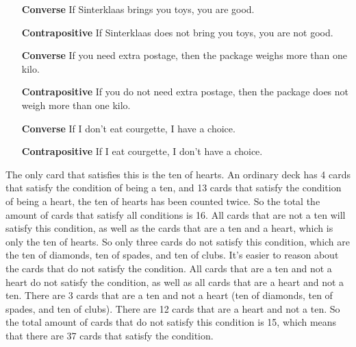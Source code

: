 \begin{solutions}
\setcounter{solutioncounter}{6}
\solution
\spart
\begin{enumerate}
	\item[\textbf{Converse}] If Sinterklaas brings you toys, you are good.
	\item[\textbf{Contrapositive}] If Sinterklaas does not bring you toys, you are not good.
\end{enumerate}
\spart
\begin{enumerate}
	\item[\textbf{Converse}] If you need extra postage, then the package weighs more than one kilo.
	\item[\textbf{Contrapositive}] If you do not need extra postage, then the package does not weigh more than one kilo.
\end{enumerate}
\spart
\begin{enumerate}
	\item[\textbf{Converse}] If I don't eat courgette, I have a choice.
	\item[\textbf{Contrapositive}] If I eat courgette, I don't have a choice.
\end{enumerate}

\setcounter{solutioncounter}{7}
\solution
\spart
The only card that satisfies this is the ten of hearts.
\spart
An ordinary deck has 4 cards that satisfy the condition of being a ten, and 13 cards that satisfy the condition of being a heart, the ten of hearts has been counted twice. So the total the amount of cards that satisfy all conditions is 16.
\spart
All cards that are not a ten will satisfy this condition, as well as the cards that are a ten and a heart, which is only the ten of hearts. So only three cards do not satisfy this condition, which are the ten of diamonds, ten of spades, and ten of clubs.
\spart
It's easier to reason about the cards that do not satisfy the condition. All cards that are a ten and not a heart do not satisfy the condition, as well as all cards that are a heart and not a ten. There are 3 cards that are a ten and not a heart (ten of diamonds, ten of spades, and ten of clubs). There are 12 cards that are a heart and not a ten. So the total amount of cards that do not satisfy this condition is 15, which means that there are 37 cards that satisfy the condition.


\end{solutions}
